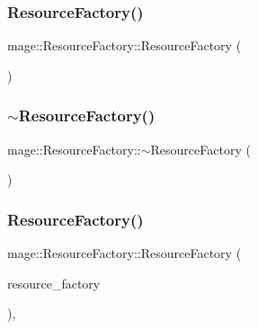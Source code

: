 \subsubsection{\texorpdfstring{Resource\+Factory()}{ResourceFactory()}\hspace{0.1cm}{\footnotesize\ttfamily [1/3]}}
{\footnotesize\ttfamily mage\+::\+Resource\+Factory\+::\+Resource\+Factory (\begin{DoxyParamCaption}{ }\end{DoxyParamCaption})}

\hypertarget{classmage_1_1_resource_factory_a58764dea5d6cd05405bd62366cc25681}{}\label{classmage_1_1_resource_factory_a58764dea5d6cd05405bd62366cc25681} 
\subsubsection{\texorpdfstring{$\sim$\+Resource\+Factory()}{~ResourceFactory()}}
{\footnotesize\ttfamily mage\+::\+Resource\+Factory\+::$\sim$\+Resource\+Factory (\begin{DoxyParamCaption}{ }\end{DoxyParamCaption})\hspace{0.3cm}{\ttfamily [virtual]}}

\hypertarget{classmage_1_1_resource_factory_ac2d236ed7dc16f4ab87d9d8e95d78a94}{}\label{classmage_1_1_resource_factory_ac2d236ed7dc16f4ab87d9d8e95d78a94} 
\subsubsection{\texorpdfstring{Resource\+Factory()}{ResourceFactory()}\hspace{0.1cm}{\footnotesize\ttfamily [2/3]}}
{\footnotesize\ttfamily mage\+::\+Resource\+Factory\+::\+Resource\+Factory (\begin{DoxyParamCaption}\item[{const \hyperlink{classmage_1_1_resource_factory}{Resource\+Factory} \&}]{resource\+\_\+factory }\end{DoxyParamCaption})\hspace{0.3cm}{\ttfamily [private]}, {\ttfamily [delete]}}

